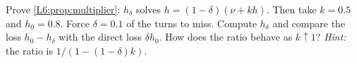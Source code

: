 \begin{exercise}\label{L6:ex:multiplier}
Prove \cref{L6:prop:multiplier}: $h_\delta$ solves $h=(1-\delta)(\nu+kh)$. Then take $k=0.5$ and $h_0=0.8$. Force $\delta=0.1$ of the turns
to miss. Compute $h_\delta$ and compare the loss $h_0-h_\delta$ with the direct loss
$\delta h_0$. How does the ratio behave as $k\uparrow1$?
\emph{Hint:} the ratio is $1/(1-(1-\delta)k)$.
\end{exercise}
